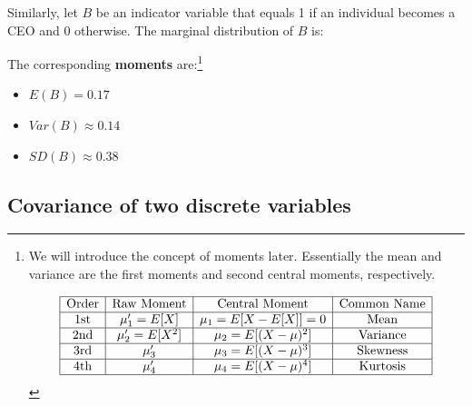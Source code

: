 \documentclass[
  letterpaper,
  DIV=11,
  numbers=noendperiod]{scrreprt}
\providecommand{\tightlist}{%
  \setlength{\itemsep}{0pt}\setlength{\parskip}{0pt}}
\begin{document}
Similarly, let \(B\) be an indicator variable that equals 1 if an
individual becomes a CEO and 0 otherwise. The marginal distribution of
\(B\) is:

\begin{table}

\caption{\label{tbl-marginal-B}Marginal Distribution of B}


\end{table}%

The corresponding \textbf{moments} are:\footnote{We will introduce the
  concept of moments later. Essentially the mean and variance are the
  first moments and second central moments, respectively.

  \[
  \begin{array}{|c|c|c|c|}
  \hline
  \text{Order} & \text{Raw Moment} & \text{Central Moment} & \text{Common Name} \\
  \hline
  \text{1st} & \mu_1' = E[X] & \mu_1 = E[X - E[X]] = 0 & \text{Mean} \\
  \hline
  \text{2nd} & \mu_2' = E[X^2] & \mu_2 = E[(X - \mu)^2] & \text{Variance} \\
  \hline
  \text{3rd} & \mu_3' & \mu_3 = E[(X - \mu)^3] & \text{Skewness} \\
  \hline
  \text{4th} & \mu_4' & \mu_4 = E[(X - \mu)^4] & \text{Kurtosis} \\
  \hline
  \end{array}
  \]}

\begin{itemize}
\tightlist
\item
  \(E(B) = 0.17\)
\item
  \(Var(B) \approx 0.14\)
\item
  \(SD(B) \approx 0.38\)
\end{itemize}

\subsection{Covariance of two discrete
variables}\label{covariance-of-two-discrete-variables}
\end{document}

